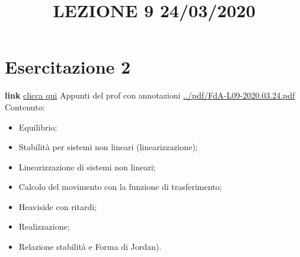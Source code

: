 \section{Esercitazione 2}
\title{LEZIONE 9 24/03/2020}\newline
\textbf{link} \href{https://web.microsoftstream.com/video/c0596b77-fd44-467c-8085-683611779644?list=user&userId=faa91214-a6f5-40d7-8875-253fd49b8ce1}{clicca qui}\newline
\newline
Appunti del prof con annotazioni \url{../pdf/FdA-L09-2020.03.24.pdf}\newline
Contenuto:
\begin{itemize}
    \item Equilibrio;
    \item Stabilità per sistemi non lineari (linearizzazione);
    \item Linearizzazione di sistemi non lineari;
    \item Calcolo del movimento con la funzione di trasferimento;
    \item Heaviside con ritardi;
    \item Realizzazione;
    \item Relazione stabilità e Forma di Jordan).
\end{itemize}
